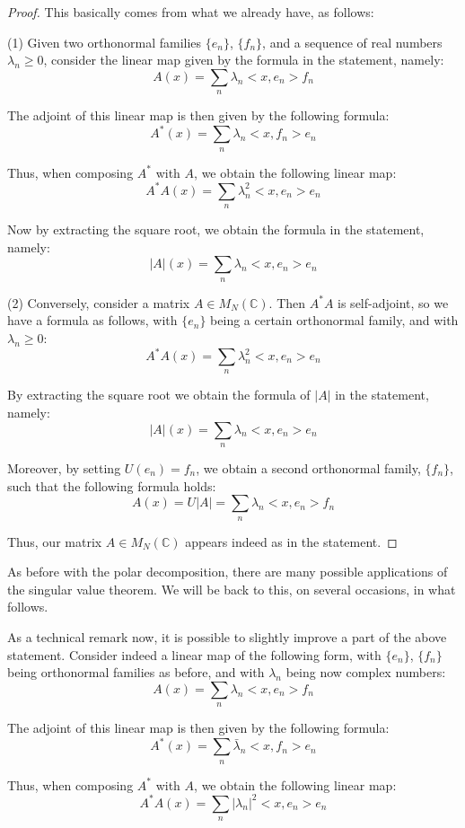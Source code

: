 \documentclass[12pt]{amsbook}
\begin{document}
\begin{proof}
This basically comes from what we already have, as follows:

\medskip

(1) Given two orthonormal families $\{e_n\}$, $\{f_n\}$, and a sequence of real numbers $\lambda_n\geq0$, consider the linear map given by the formula in the statement, namely:
$$A(x)=\sum_n\lambda_n<x,e_n>f_n$$

The adjoint of this linear map is then given by the following formula: 
$$A^*(x)=\sum_n\lambda_n<x,f_n>e_n$$

Thus, when composing $A^*$ with $A$, we obtain the following linear map:
$$A^*A(x)=\sum_n\lambda_n^2<x,e_n>e_n$$

Now by extracting the square root, we obtain the formula in the statement, namely:
$$|A|(x)=\sum_n\lambda_n<x,e_n>e_n$$

(2) Conversely, consider a matrix $A\in M_N(\mathbb C)$. Then $A^*A$ is self-adjoint, so we have a formula as follows, with $\{e_n\}$ being a certain orthonormal family, and with $\lambda_n\geq0$:
$$A^*A(x)=\sum_n\lambda_n^2<x,e_n>e_n$$

By extracting the square root we obtain the formula of $|A|$ in the statement, namely:
$$|A|(x)=\sum_n\lambda_n<x,e_n>e_n$$

Moreover, by setting $U(e_n)=f_n$, we obtain a second orthonormal family, $\{f_n\}$, such that the following formula holds:
$$A(x)
=U|A|
=\sum_n\lambda_n<x,e_n>f_n$$

Thus, our matrix $A\in M_N(\mathbb C)$ appears indeed as in the statement.
\end{proof}

As before with the polar decomposition, there are many possible applications of the singular value theorem. We will be back to this, on several occasions, in what follows. 

\bigskip

As a technical remark now, it is possible to slightly improve a part of the above statement. Consider indeed a linear map of the following form, with $\{e_n\}$, $\{f_n\}$ being orthonormal families as before, and with $\lambda_n$ being now complex numbers:
$$A(x)=\sum_n\lambda_n<x,e_n>f_n$$

The adjoint of this linear map is then given by the following formula: 
$$A^*(x)=\sum_n\bar{\lambda}_n<x,f_n>e_n$$

Thus, when composing $A^*$ with $A$, we obtain the following linear map:
$$A^*A(x)=\sum_n|\lambda_n|^2<x,e_n>e_n$$
\end{document}
